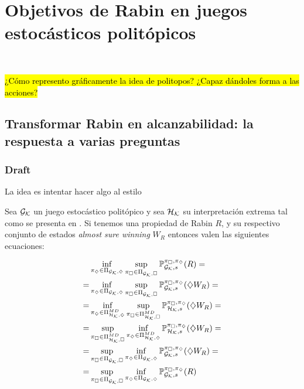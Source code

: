 \chapter{Objetivos de Rabin en juegos estocásticos politópicos}
~\label{cap:results}





\hl{¿Cómo represento gráficamente la idea de politopos? ¿Capaz dándoles forma a las acciones?}

\section{Transformar Rabin en alcanzabilidad: la respuesta a varias preguntas}

\subsection{Draft}

La idea es intentar hacer algo al estilo

\begin{theorem}
	Sea $\Gk$ un juego estocástico politópico y sea $\Hk$ su interpretación extrema tal como se presenta en \cite{Polytopal}. Si tenemos una propiedad de Rabin $R$, y su respectivo conjunto de estados \textit{almost sure winning} $W_R$ entonces valen las siguientes ecuaciones:

	\begin{align*}
		&\inf_{\piGdiam} \sup_{\piGcuad} \ProbG(R) = \\
		= &\inf_{\piGdiam} \sup_{\piGcuad} \ProbG(\alc W_R) = \\
		= &\inf_{\piHdiamMD} \sup_{\piHcuadMD} \ProbH(\alc W_R) = \\
		= &\sup_{\piHcuadMD} \inf_{\piHdiamMD} \ProbH(\alc W_R) = \\
		= &\sup_{\piGcuad} \inf_{\piGdiam} \ProbG(\alc W_R) = \\
		= &\sup_{\piGcuad} \inf_{\piGdiam} \ProbG(R)
	\end{align*}

\end{theorem}

